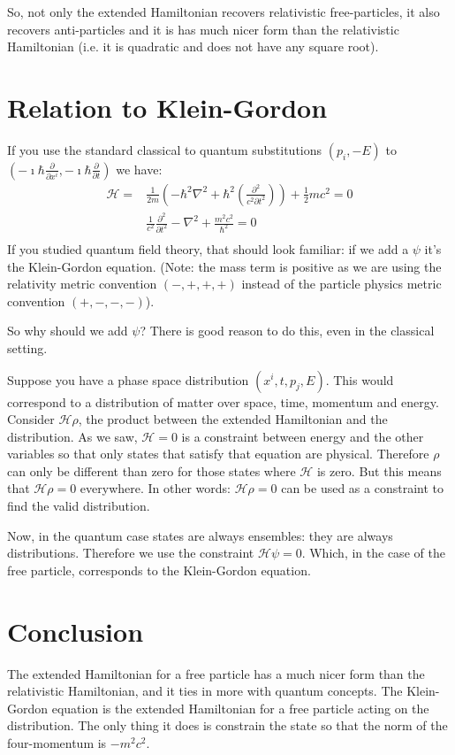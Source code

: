 \documentclass[aps,pra,10pt,floatfix,nofootinbib]{revtex4-1}
\theoremstyle{definition}
\begin{document}
So, not only the extended Hamiltonian recovers relativistic free-particles, it also recovers anti-particles and it is has much nicer form than the relativistic Hamiltonian (i.e. it is quadratic and does not have any square root).


\section{Relation to Klein-Gordon}

If you use the standard classical to quantum substitutions $\left( p_i, -E \right)$ to $\left(-\imath \hbar \frac{\partial}{\partial x^i}, -\imath \hbar \frac{\partial}{\partial t} \right)$ we have:
\begin{equation}
\begin{aligned}
\mathcal{H} = &\frac{1}{2m} \left(- \hbar^2 \nabla^2 + \hbar^2 \left(\frac{\partial^2}{c^2\partial t^2}\right)\right)  + \frac{1}{2} mc^2 = 0\\
&\frac{1}{c^2}\frac{\partial^2}{\partial t^2}- \nabla^2 + \frac{m^2 c^2}{\hbar^2}  = 0\\
\end{aligned}
\label{KleinGordon}
\end{equation}
If you studied quantum field theory, that should look familiar: if we add a $\psi$ it's the Klein-Gordon equation. (Note: the mass term is positive as we are using the relativity metric convention $(-,+,+,+)$ instead of the particle physics metric convention $(+, -, -, -)$).

So why should we add $\psi$? There is good reason to do this, even in the classical setting.

Suppose you have a phase space distribution $(x^i,t,p_j,E)$. This would correspond to a distribution of matter over space, time, momentum and energy. Consider $\mathcal{H} \rho$, the product between the extended Hamiltonian and the distribution. As we saw, $\mathcal{H}=0$ is a constraint between energy and the other variables so that only states that satisfy that equation are physical. Therefore $\rho$ can only be different than zero for those states where $\mathcal{H}$ is zero. But this means that $\mathcal{H} \rho = 0$ everywhere. In other words: $\mathcal{H} \rho = 0$ can be used as a constraint to find the valid distribution.

Now, in the quantum case states are always ensembles: they are always distributions. Therefore we use the constraint $\mathcal{H}\psi = 0$. Which, in the case of the free particle, corresponds to the Klein-Gordon equation.

\section{Conclusion}

The extended Hamiltonian for a free particle has a much nicer form than the relativistic Hamiltonian, and it ties in more with quantum concepts. The Klein-Gordon equation is the extended Hamiltonian for a free particle acting on the distribution. The only thing it does is constrain the state so that the norm of the four-momentum is $-m^2c^2$.
\end{document}
